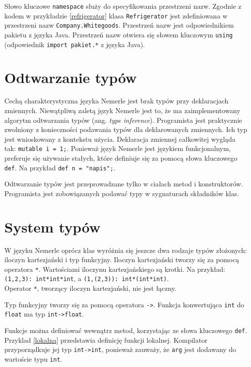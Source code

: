 \documentclass[a4paper,12pt]{mwbk}
\begin{document}
Słowo kluczowe \lstinline!namespace! służy do specyfikowania przestrzeni nazw.
Zgodnie z kodem w przykładzie \ref{refrigerator} klasa \lstinline!Refrigerator!
jest zdefiniowana w przestrzeni nazw \lstinline!Company.Whitegoods!. Przestrzeń
nazw jest odpowiednikiem pakietu z języka Java. Przestrzeń nazw otwiera się
słowem kluczowym \lstinline!using! (odpowiednik 
\lstinline!import pakiet.*! z języka Java).


\section{Odtwarzanie typów}

Cechą charakterystyczna języka Nemerle jest brak typów przy deklaracjach
zmiennych. Niewątpliwą zaletą język Nemerle jest to, że ma zaimplementowany
algorytm odtwarzania typów (ang. \emph{type inference}). Programista jest
praktycznie zwolniony z konieczności podawania typów dla deklarowanych
zmiennych. Ich typ jest wnioskowany z kontekstu użycia. Deklaracja zmiennej
całkowitej wygląda tak: \lstinline!mutable i = 1;!. Ponieważ język Nemerle jest
językiem funkcjonalnym, preferuje się używanie stałych, które definiuje się za
pomocą słowa kluczowego \lstinline!def!. 
Na przykład \lstinline!def n = "napis";!.

Odtwarzanie typów jest przeprowadzane tylko w ciałach metod i konstruktorów.
Programista jest zobowiązanych podawać typy w sygnaturach składników klas.


\section{System typów}

W języku Nemerle oprócz klas wyróżnia się jeszcze dwa rodzaje typów złożonych: iloczyn
kartezjański i typ funkcyjny.  Iloczyn kartezjański tworzy się za pomocą
operatora \lstinline!*!. Wartościami iloczynu kartezjańskiego są krotki. Na
przykład: \\
\lstinline!(1,2,3): int*int*int!, a \lstinline!(1,(2,3)): int*(int*int)!.\\
Operator \lstinline!*!, tworzący iloczyn kartezjański, nie jest łączny.

Typ funkcyjny tworzy się za pomocą operatora \lstinline!->!. Funkcja
konwertująca \lstinline!int! do \lstinline!float! ma typ
\lstinline!int->float!.

Funkcje można definiować wewnątrz metod, korzystając ze słowa kluczowego
\lstinline!def!. Przyklad \ref{lokalna} przedstawia definicję funkcji
lokalnej. Kompilator przyporządkuje jej typ \lstinline!int->int!, ponieważ
zauważy, że \lstinline!arg! jest dodawany do wartoście typu \lstinline!int!.
\end{document}
